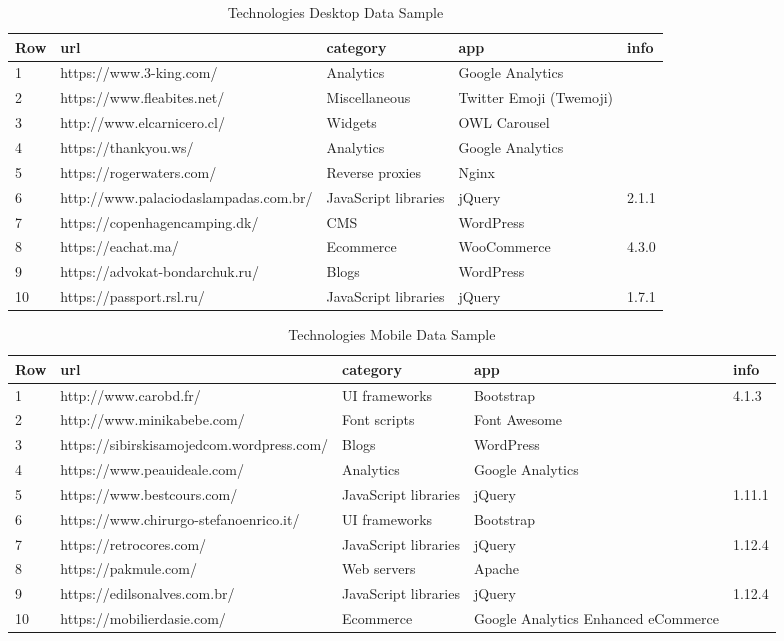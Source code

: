 \begin{enumerate}
\begin{table}[H]
\centering
\begin{tabular}{|l|l|p{3cm}|p{3cm}|l|}
	\hline
	\textbf{Row} & \textbf{url} & \textbf{category} & app & info\\
	\hline
	1 & https://www.3-king.com/ & Analytics & Google Analytics & \\
	\hline
	2 & https://www.fleabites.net/ & Miscellaneous & Twitter Emoji (Twemoji) & \\
	\hline
	3 & http://www.elcarnicero.cl/ & Widgets & OWL Carousel & \\
	\hline
	4 & https://thankyou.ws/ & Analytics & Google Analytics & \\
	\hline
	5 & https://rogerwaters.com/ & Reverse proxies & Nginx & \\
	\hline
	6 & http://www.palaciodaslampadas.com.br/ & JavaScript libraries & jQuery & 2.1.1\\
	\hline
	7 & https://copenhagencamping.dk/ & CMS & WordPress & \\
	\hline
	8 & https://eachat.ma/ & Ecommerce & WooCommerce & 4.3.0\\
	\hline
	9 & https://advokat-bondarchuk.ru/ & Blogs & WordPress & \\
	\hline
	10 & https://passport.rsl.ru/ & JavaScript libraries & jQuery & 1.7.1\\
	\hline
\end{tabular}
\caption{Technologies Desktop Data Sample}
\label{table:ct_tech_desktop}
\end{table}

\begin{table}[H]
\centering
\begin{tabular}{|l|l|p{3cm}|p{3cm}|l|}
	\hline
	\textbf{Row} & \textbf{url} & \textbf{category} & app & info\\
	\hline
	1 & http://www.carobd.fr/ & UI frameworks & Bootstrap & 4.1.3\\
	\hline
	2 & http://www.minikabebe.com/ & Font scripts & Font Awesome & \\
	\hline
	3 & https://sibirskisamojedcom.wordpress.com/ & Blogs & WordPress & \\
	\hline
	4 & https://www.peauideale.com/ & Analytics & Google Analytics & \\
	\hline
	5 & https://www.bestcours.com/ & JavaScript libraries & jQuery & 1.11.1\\
	\hline
	6 & https://www.chirurgo-stefanoenrico.it/ & UI frameworks & Bootstrap & \\
	\hline
	7 & https://retrocores.com/ & JavaScript libraries & jQuery & 1.12.4\\
	\hline
	8 & https://pakmule.com/ & Web servers & Apache & \\
	\hline
	9 & https://edilsonalves.com.br/ & JavaScript libraries & jQuery & 1.12.4\\
	\hline
	10 & https://mobilierdasie.com/ & Ecommerce & Google Analytics Enhanced eCommerce & \\
	\hline
\end{tabular}
\caption{Technologies Mobile Data Sample}
\label{table:ct_tech_mobile}
\end{table}



\end{enumerate}
